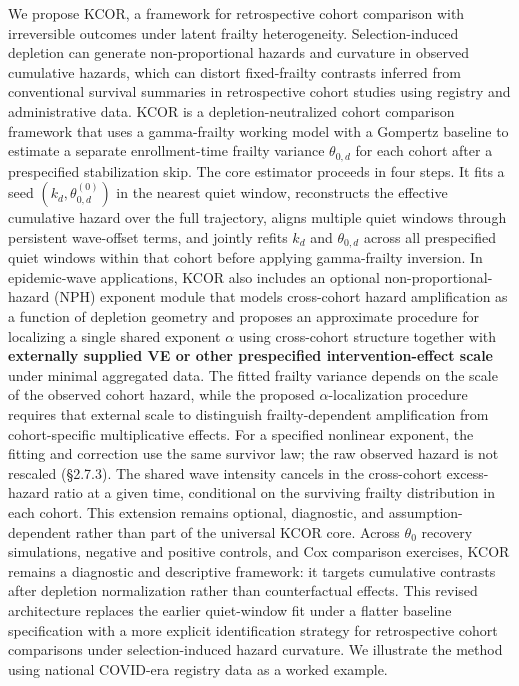 \documentclass[
]{article}
\begin{document}
We propose KCOR, a framework for retrospective cohort comparison with irreversible outcomes under latent frailty heterogeneity. Selection-induced depletion can generate non-proportional hazards and curvature in observed cumulative hazards, which can distort fixed-frailty contrasts inferred from conventional survival summaries in retrospective cohort studies using registry and administrative data. KCOR is a depletion-neutralized cohort comparison framework that uses a gamma-frailty working model with a Gompertz baseline to estimate a separate enrollment-time frailty variance \(\theta_{0,d}\) for each cohort after a prespecified stabilization skip. The core estimator proceeds in four steps. It fits a seed \((k_d,\theta_{0,d}^{(0)})\) in the nearest quiet window, reconstructs the effective cumulative hazard over the full trajectory, aligns multiple quiet windows through persistent wave-offset terms, and jointly refits \(k_d\) and \(\theta_{0,d}\) across all prespecified quiet windows within that cohort before applying gamma-frailty inversion. In epidemic-wave applications, KCOR also includes an optional non-proportional-hazard (NPH) exponent module that models cross-cohort hazard amplification as a function of depletion geometry and proposes an approximate procedure for localizing a single shared exponent \(\alpha\) using cross-cohort structure together with \textbf{externally supplied VE or other prespecified intervention-effect scale} under minimal aggregated data. The fitted frailty variance depends on the scale of the observed cohort hazard, while the proposed \(\alpha\)-localization procedure requires that external scale to distinguish frailty-dependent amplification from cohort-specific multiplicative effects. For a specified nonlinear exponent, the fitting and correction use the same survivor law; the raw observed hazard is not rescaled (§2.7.3). The shared wave intensity cancels in the cross-cohort excess-hazard ratio at a given time, conditional on the surviving frailty distribution in each cohort. This extension remains optional, diagnostic, and assumption-dependent rather than part of the universal KCOR core. Across \(\theta_0\) recovery simulations, negative and positive controls, and Cox comparison exercises, KCOR remains a diagnostic and descriptive framework: it targets cumulative contrasts after depletion normalization rather than counterfactual effects. This revised architecture replaces the earlier quiet-window fit under a flatter baseline specification with a more explicit identification strategy for retrospective cohort comparisons under selection-induced hazard curvature. We illustrate the method using national COVID-era registry data as a worked example.
\end{document}
